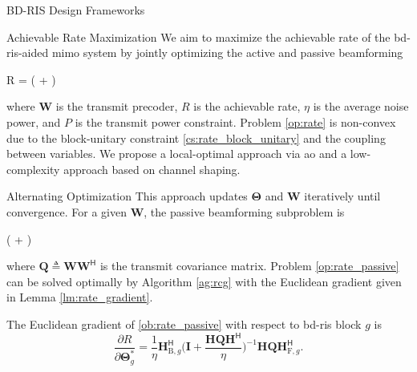 \begin{section}{BD-RIS Design Frameworks}
\begin{subsection}{Achievable Rate Maximization}\label{sc:rate}
We aim to maximize the achievable rate of the \gls{bd}-\gls{ris}-aided \gls{mimo} system by jointly optimizing the active and passive beamforming
\begin{maxi!}
{}{R = \log \det \biggl( + \biggr)}{\label{op:rate}}{\label{ob:rate}}
\end{maxi!}
where $\mathbf{W}$ is the transmit precoder, $R$ is the achievable rate, $\eta$ is the average noise power, and $P$ is the transmit power constraint.
Problem \eqref{op:rate} is non-convex due to the block-unitary constraint \eqref{cs:rate_block_unitary} and the coupling between variables.
We propose a local-optimal approach via \gls{ao} and a low-complexity approach based on channel shaping.

\begin{subsubsection}{Alternating Optimization}
This approach updates $\mathbf{\Theta}$ and $\mathbf{W}$ iteratively until convergence.
For a given $\mathbf{W}$, the passive beamforming subproblem is
\begin{maxi!}
{\scriptstyle{\mathbf{\Theta}}}{\log \det \biggl( + \biggr)}{\label{op:rate_passive}}{\label{ob:rate_passive}}
\end{maxi!}
where $\mathbf{Q} \triangleq \mathbf{W} \mathbf{W}^\mathsf{H}$ is the transmit covariance matrix.
Problem \eqref{op:rate_passive} can be solved optimally by Algorithm \ref{ag:rcg} with the Euclidean gradient given in Lemma \ref{lm:rate_gradient}.
\begin{lemma}\label{lm:rate_gradient}
	The Euclidean gradient of \eqref{ob:rate_passive} with respect to \gls{bd}-\gls{ris} block $g$ is
	\begin{equation}
		\frac{\partial R}{\partial \mathbf{\Theta}_g^*} = \frac{1}{\eta} \mathbf{H}_{\mathrm{B},g}^\mathsf{H} \biggl(\mathbf{I} + \frac{\mathbf{H}\mathbf{Q}\mathbf{H}^\mathsf{H}}{\eta}\biggr)^{-1} \mathbf{H} \mathbf{Q} \mathbf{H}_{\mathrm{F},g}^\mathsf{H}.
		\label{eq:rate_gradient}
	\end{equation}
\end{lemma}


\end{subsubsection}
\end{subsection}
\end{section}
